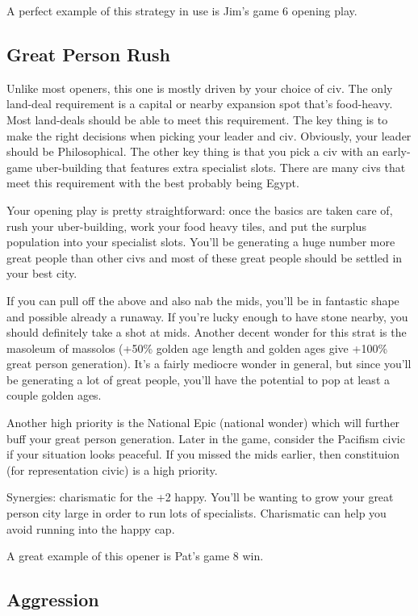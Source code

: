 \documentclass[10pt]{article}
\begin{document}
A perfect example of this strategy in use is Jim's game 6 opening play.

\subsection*{Great Person Rush}

Unlike most openers, this one is mostly driven by your choice of civ. The only land-deal requirement is a capital
or nearby expansion spot that's food-heavy. Most land-deals should be able to meet this requirement. The key thing
is to make the right decisions when picking your leader and civ. Obviously, your leader should be Philosophical. The
other key thing is that you pick a civ with an early-game uber-building that features extra specialist slots. There are
many civs that meet this requirement with the best probably being Egypt.

Your opening play is pretty straightforward: once the basics are taken care of, rush your uber-building, work your food
heavy tiles, and put the surplus population into your specialist slots. You'll be generating a huge number more great people
than other civs and most of these great people should be settled in your best city.

If you can pull off the above and also nab the mids, you'll be in
fantastic shape and possible already a runaway. If you're lucky enough
to have stone nearby, you should definitely take a shot at
mids. Another decent wonder for this strat is the masoleum of massolos
(+50\% golden age length and golden ages give +100\% great person
generation). It's a fairly mediocre wonder in general, but since
you'll be generating a lot of great people, you'll have the potential
to pop at least a couple golden ages.

Another high priority is the National Epic (national wonder) which will further buff your great person generation. Later
in the game, consider the Pacifism civic if your situation looks peaceful. If you missed the mids earlier, then
constituion (for representation civic) is a high priority.

Synergies: charismatic for the +2 happy. You'll be wanting to grow your great person city large in order to run lots
of specialists. Charismatic can help you avoid running into the happy cap.

A great example of this opener is Pat's game 8 win.

\subsection*{Aggression}
\end{document}
